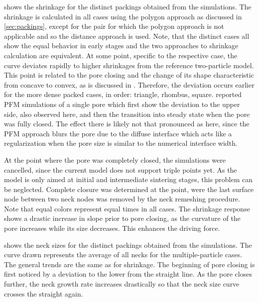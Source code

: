  shows the shrinkage for the distinct packings obtained from the simulations.
The shrinkage is calculated in all cases using the polygon approach as discussed in \cref{sec:packings}, except for the pair for which the polygon approach is not applicable and so the distance approach is used.
Note, that the distinct cases all show the equal behavior in early stages and the two approaches to shrinkage calculation are equivalent.
At some point, specific to the respective case, the curve deviates rapidly to higher shrinkages from the reference two-particle model.
This point is related to the pore closing and the change of its shape characteristic from concave to convex, as is discussed in \textcite{Tikare2003}.
Therefore, the deviation occurs earlier for the more dense packed cases, in order: triangle, rhombus, square.
\textcite{Jing2003} reported \gls{PFM} simulations of a single pore which first show the deviation to the upper side, also observed here, and then the transition into steady state when the pore was fully closed.
The effect there is likely not that pronounced as here, since the \gls{PFM} approach blurs the pore due to the diffuse interface which acts like a regularization when the pore size is similar to the numerical interface width.

At the point where the pore was completely closed, the simulations were cancelled, since the current model does not support triple points yet.
As the model is only aimed at initial and intermediate sintering stages, this problem can be neglected.
Complete closure was determined at the point, were the last surface node between two neck nodes was removed by the neck remeshing procedure.
Note that equal colors represent equal times in all cases.
The shrinkage response shows a drastic increase in slope prior to pore closing, as the curvature of the pore increases while its size decreases.
This enhances the driving force.

 shows the neck sizes for the distinct packings obtained from the simulations.
The curve drawn represents the average of all necks for the multiple-particle cases.
The general trends are the same as for shrinkage.
The beginning of pore closing is first noticed by a deviation to the lower from the straight line.
As the pore closes further, the neck growth rate increases drastically so that the neck size curve crosses the straight again.

